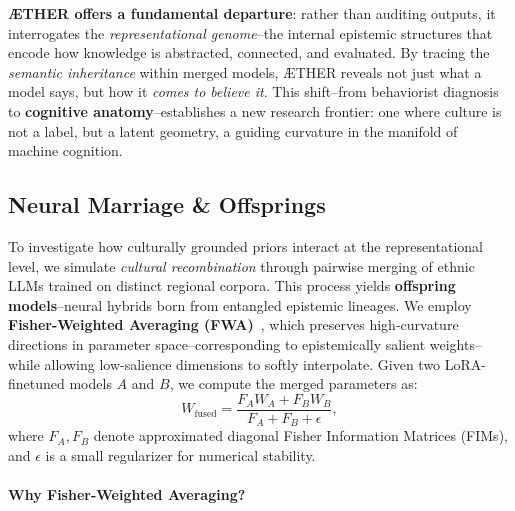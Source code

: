 \textbf{ÆTHER offers a fundamental departure}: rather than auditing outputs, it interrogates the \emph{representational genome}--the internal epistemic structures that encode how knowledge is abstracted, connected, and evaluated. By tracing the \textit{semantic inheritance} within merged models, ÆTHER reveals not just what a model says, but how it \emph{comes to believe it}. This shift--from behaviorist diagnosis to \textbf{cognitive anatomy}--establishes a new research frontier: one where culture is not a label, but a latent geometry, a guiding curvature in the manifold of machine cognition.



\subsection{Neural Marriage \& Offsprings}

To investigate how culturally grounded priors interact at the representational level, we simulate \textit{cultural recombination} through pairwise merging of ethnic LLMs trained on distinct regional corpora. This process yields \textbf{offspring models}--neural hybrids born from entangled epistemic lineages. We employ \textbf{Fisher-Weighted Averaging (FWA)}~\citep{matena2022merging}, which preserves high-curvature directions in parameter space--corresponding to epistemically salient weights--while allowing low-salience dimensions to softly interpolate. Given two LoRA-finetuned models $A$ and $B$, we compute the merged parameters as:
\[
W_{\mathrm{fused}} = \frac{F_A W_A + F_B W_B}{F_A + F_B + \epsilon},
\]
where $F_A, F_B$ denote approximated diagonal Fisher Information Matrices (FIMs), and $\epsilon$ is a small regularizer for numerical stability.

\paragraph{Why Fisher-Weighted Averaging?}

